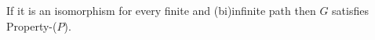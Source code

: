 \documentclass[preview]{standalone}
\begin{document}
If it is an isomorphism for every finite and (bi)infinite path then $G$ satisfies Property-($P$).\\
\end{document}
